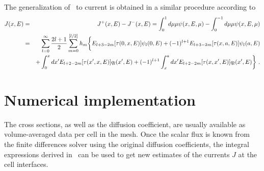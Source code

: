 %
The generalization of~ to current is obtained in a similar procedure according to
\begin{eqnarray}\label{eq:tot-J}
J(x,E) &=& J^+(x,E) - J^-(x,E) = \int_0^1 {d\mu \mu \psi(x,E,\mu)} 
- \int_0^{-1} {d\mu \mu \psi(x,E,\mu)} \nonumber \\
&=&\sum\limits_{l=0}^\infty  \frac{2l+1}{2}
\sum\limits_{m=0}^{[l/2]}  h_m
\bigg\{
E_{l+3-2m}[\tau(0,x,E)]	\psi_l(0,E) 
+(-1)^{l+1} E_{l+3-2m}[\tau(x,a,E)]\psi_l(a,E)  \nonumber \\
&&+
\int_0^x dx' E_{l+2-2m}[\tau(x',x,E)] q_l(x',E)
+(-1)^{l+1} \int_x^a dx' E_{l+2-2m}[\tau(x,x',E)] q_l(x',E)
\bigg\}	\,\, . 
\end{eqnarray}
%
%

%
\section{Numerical implementation}
\label{sec:imp}

The cross sections, as well as the diffusion coefficient, are usually available as volume-averaged data per cell in the mesh. Once the scalar flux is known from the finite differences solver using the original diffusion coefficients, the integral expressions derived in~ can be used to get new estimates of the currents $J$ at the cell interfaces. 

